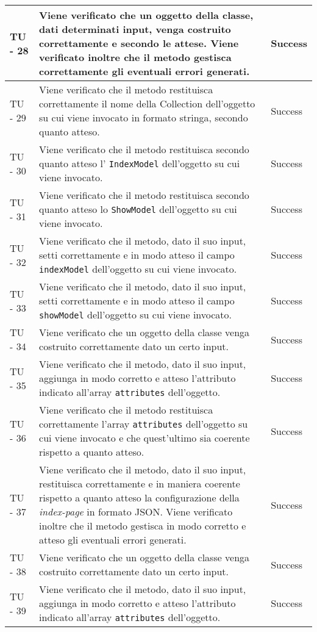 \begin{center}
\begin{longtable}{ | p{3cm} | p{9cm} | p{2cm} | }
TU - 28 & Viene verificato che un oggetto della classe, dati determinati input, venga costruito correttamente e secondo le attese. Viene verificato inoltre che il metodo gestisca correttamente gli eventuali errori generati. & Success \\ \hline
TU - 29 & Viene verificato che il metodo restituisca correttamente il nome della Collection dell'oggetto su cui viene invocato in formato stringa, secondo quanto atteso. & Success \\ \hline
TU - 30 & Viene verificato che il metodo restituisca secondo quanto atteso l' \texttt{IndexModel} dell'oggetto su cui viene invocato. & Success \\ \hline
TU - 31 & Viene verificato che il metodo restituisca secondo quanto atteso lo \texttt{ShowModel} dell'oggetto su cui viene invocato. & Success \\ \hline
TU - 32 & Viene verificato che il metodo, dato il suo input, setti correttamente e in modo atteso il campo \texttt{indexModel} dell'oggetto su cui viene invocato. & Success \\ \hline
TU - 33 & Viene verificato che il metodo, dato il suo input, setti correttamente e in modo atteso il campo \texttt{showModel} dell'oggetto su cui viene invocato. & Success \\ \hline
TU - 34 & Viene verificato che un oggetto della classe venga costruito correttamente dato un certo input. & Success \\ \hline
TU - 35 & Viene verificato che il metodo, dato il suo input, aggiunga in modo corretto e atteso l'attributo indicato all'array \texttt{attributes} dell'oggetto. & Success \\ \hline
TU - 36 & Viene verificato che il metodo restituisca correttamente l'array \texttt{attributes} dell'oggetto su cui viene invocato e che quest'ultimo sia coerente rispetto a quanto atteso. & Success \\ \hline
TU - 37 & Viene verificato che il metodo, dato il suo input, restituisca correttamente e in maniera coerente rispetto a quanto atteso la configurazione della \textit{index-page} in formato JSON. Viene verificato inoltre che il metodo gestisca in modo corretto e atteso gli eventuali errori generati. & Success \\ \hline
TU - 38 & Viene verificato che un oggetto della classe venga costruito correttamente dato un certo input. & Success \\ \hline
TU - 39 & Viene verificato che il metodo, dato il suo input, aggiunga in modo corretto e atteso l'attributo indicato all'array \texttt{attributes} dell'oggetto. & Success \\ \hline

\end{longtable}
\end{center}

